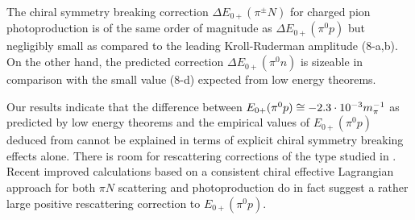 The chiral symmetry breaking correction $\Delta E_{0+}(\pi^\pm N)$ for
charged pion photoproduction is of the same order of magnitude 
as $\Delta E_{0+}(\pi^0 p)$ but negligibly small as compared 
to the leading Kroll-Ruderman amplitude (8-a,b). On the other hand, the 
predicted correction $\Delta E_{0+}(\pi^0 n)$ is sizeable in comparison
with the small value (8-d) expected from low energy theorems.

Our results indicate that the difference between $E_{0+}(\pi^0 p)
\cong -2.3\cdot 10^{-3}m_{\pi}^{-1}$ as predicted by low energy theorems and the empirical
values of $E_{0+}(\pi^0p)$ deduced from \cite{Maz,Bec} cannot
be explained in terms of explicit chiral symmetry breaking effects alone. 
There is room for rescattering corrections of the type studied in 
\cite{Noz,Yan}. Recent improved calculations \cite{Ya2} based on a consistent
chiral effective Lagrangian approach for both $\pi N$ scattering 
and photoproduction do in fact suggest a rather large positive
rescattering correction  to $E_{0+}(\pi^0p)$.
